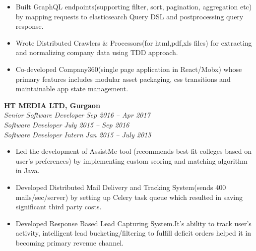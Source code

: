 \documentclass[margin,line]{resume}
\begin{document}
\begin{resume}
\begin{itemize}
            \item Built GraphQL endpoints(supporting filter, sort, pagination, aggregation etc) by mapping requests to elasticsearch Query DSL and postprocessing query response.
            \item Wrote Distributed Crawlers \& Processors(for html,pdf,xls files) for extracting and normalizing company data using TDD approach.
           \item Co-developed Company360(single page application in React/Mobx) whose primary features includes modular asset packaging, css transitions and maintainable app state management.
        \end{itemize}

    \textbf{HT MEDIA LTD, Gurgaon}\\
           \textsl{Senior Software Developer} \hfill \textsl{Sep 2016 -- Apr 2017} \vspace{0mm}\\\vspace{0mm}%
           \textsl{Software Developer} \hfill \textsl{July 2015 -- Sep 2016} \vspace{0mm}\\\vspace{0mm}%
           \textsl{Software Developer Intern} \hfill \textsl{Jan 2015 -- July 2015} \vspace{1mm}%
    \begin{itemize}
			\item Led the development of AssistMe tool (recommends best fit colleges based on user's preferences) by implementing custom scoring and matching algorithm in Java.
            \item Developed Distributed Mail Delivery and Tracking System(sends 400 mails/sec/server) by setting up Celery task queue which resulted in saving significant third party costs.
            \item Developed Response Based Lead Capturing System.It's ability to track user's activity, intelligent lead bucketing/filtering to fulfill deficit orders helped it in becoming primary revenue channel.


\end{itemize}
\end{resume}
\end{document}
